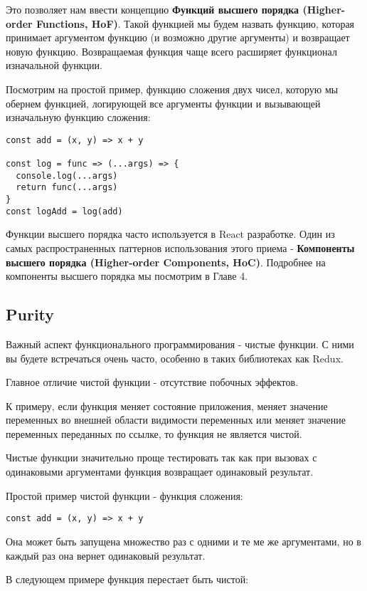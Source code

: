 Это позволяет нам ввести концепцию \textbf{Функций высшего порядка (Higher-order Functions, HoF)}. Такой функцией мы будем назвать функцию, которая принимает аргументом функцию (и возможно другие аргументы) и возвращает новую функцию. Возвращаемая функция чаще всего расширяет функционал изначальной функции.

Посмотрим на простой пример, функцию сложения двух чисел, которую мы обернем функцией, логирующей все аргументы функции и вызывающей изначальную функцию сложения:

\begin{lstlisting}
const add = (x, y) => x + y

const log = func => (...args) => {
  console.log(...args)
  return func(...args)
}
const logAdd = log(add)
\end{lstlisting}

Функции высшего порядка часто используется в React разработке. Один из самых распространенных паттернов использования этого приема - \textbf{Компоненты высшего порядка (Higher-order Components, HoC)}. Подробнее на компоненты высшего порядка мы посмотрим в Главе 4.

\subsection*{Purity}

Важный аспект функционального программирования - чистые функции. С ними вы будете встречаться очень часто, особенно в таких библиотеках как Redux.

Главное отличие чистой функции - отсутствие побочных эффектов.

К примеру, если функция меняет состояние приложения, меняет значение переменных во внешней области видимости переменных или меняет значение переменных переданных по ссылке, то функция не является чистой.

Чистые функции значительно проще тестировать так как при вызовах с одинаковыми аргументами функция возвращает одинаковый результат.

Простой пример чистой функции - функция сложения:

\begin{lstlisting}
const add = (x, y) => x + y 
\end{lstlisting}

Она может быть запущена множество раз с одними и те ме же аргументами, но в каждый раз она вернет одинаковый результат. 

В следующем примере функция перестает быть чистой:


